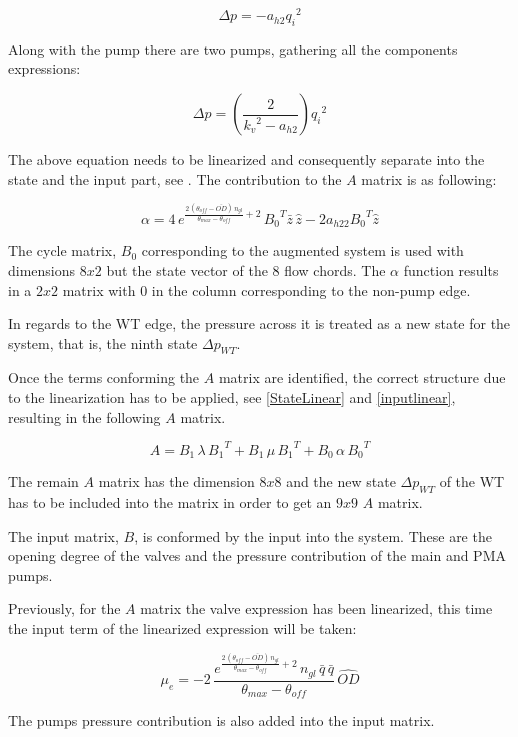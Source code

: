 \begin{equation}
    \Delta p = -a_{h2}{q_i}^2 
\end{equation}

Along with the pump there are two pumps, gathering all the components expressions:

\begin{equation}
      \Delta p = (\frac{2}{{k_v}^2-a_{h2}}){q_i}^2 
\end{equation} 

The above equation needs to be linearized and consequently separate into the state and the input part, see . The contribution to the $A$ matrix is as 
following:

\begin{equation}
  \alpha = 4 \, e^{\frac{2 \, (\theta_{off} - \bar{OD}) \, n_{gl}}{\theta_{max}-\theta_{off}}+2} \, {B_0}^{T} \bar{z} \, \hat{z} - 2 a_{h22} {B_0}^{T} \hat{z}
\end{equation}

The cycle matrix, $B_0$ corresponding to the augmented system is used with dimensions $8x2$ but the state vector of the 8 flow chords.
 The $\alpha$ function results in a $2x2$ matrix with $0$ in the column corresponding to the non-pump edge. 

In regards to the WT edge, the pressure across it is treated as a new state for the system, that is, the ninth state $\Delta p_{WT}$. 

Once the terms conforming the $A$ matrix are identified, the correct structure due to the linearization has to be applied, see \eqref{StateLinear} and \eqref{inputlinear}, resulting in
the following $A$ matrix.

\begin{equation}
  A = B_1 \, \lambda \, {B_1}^T + B_1 \, \mu \, {B_1}^T + B_0 \, \alpha \, {B_0}^T
\end{equation}

The remain $A$ matrix has the dimension $8x8$ and the new state $\Delta p_{WT}$ of the WT has to be included into the matrix in order to get an $9x9$ $A$ 
matrix. 

The input matrix, $B$, is conformed by the input into the system. These are the opening degree of the valves and the pressure contribution of the main 
and PMA pumps. 

Previously, for the $A$ matrix the valve expression has been linearized, this time the input term of the linearized expression will be taken:

\begin{equation}
  {\mu}_e = -2 \, \frac{e^{\frac{2 \, (\theta_{off} - \bar{OD}) \, n_{gl}}{\theta_{max}-\theta_{off}}+2}
   \, n_{gl} \,  \bar{q} \, \bar{q}}{\theta_{max}-\theta_{off}} \, \hat{OD}
\end{equation}

The pumps pressure contribution is also added into the input matrix. 



 

